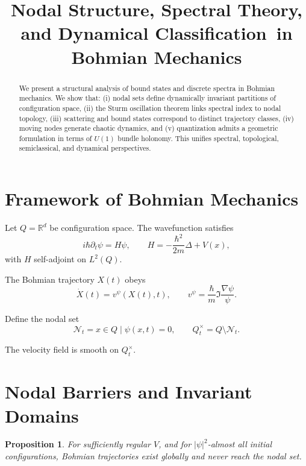 \documentclass[11pt]{article}
\title{Nodal Structure, Spectral Theory, and Dynamical Classification\
in Bohmian Mechanics}
\author{}
\date{}
\theoremstyle{plain}
\newtheorem{proposition}{Proposition}
\theoremstyle{definition}
\begin{document}
\maketitle

\begin{abstract}
We present a structural analysis of bound states and discrete spectra in Bohmian mechanics.
We show that:
(i) nodal sets define dynamically invariant partitions of configuration space,
(ii) the Sturm oscillation theorem links spectral index to nodal topology,
(iii) scattering and bound states correspond to distinct trajectory classes,
(iv) moving nodes generate chaotic dynamics,
and (v) quantization admits a geometric formulation in terms of $U(1)$ bundle holonomy.
This unifies spectral, topological, semiclassical, and dynamical perspectives.
\end{abstract}

\tableofcontents

\section{Framework of Bohmian Mechanics}

Let $Q=\mathbb{R}^d$ be configuration space. The wavefunction satisfies
\begin{equation}
i\hbar \partial_t \psi = H \psi,
\qquad
H = -\frac{\hbar^2}{2m}\Delta + V(x),
\end{equation}
with $H$ self-adjoint on $L^2(Q)$.

The Bohmian trajectory $X(t)$ obeys
\begin{equation}
\dot X(t) = v^\psi(X(t),t),
\qquad
v^\psi = \frac{\hbar}{m} \Im \frac{\nabla \psi}{\psi}.
\end{equation}

Define the nodal set
\[
\mathcal N_t = {x\in Q \mid \psi(x,t)=0},
\qquad
Q_t^\times = Q\setminus \mathcal N_t.
\]

The velocity field is smooth on $Q_t^\times$.

\section{Nodal Barriers and Invariant Domains}

\begin{proposition}
For sufficiently regular $V$, and for $|\psi|^2$-almost all initial configurations,
Bohmian trajectories exist globally and never reach the nodal set.
\end{proposition}
\end{document}
